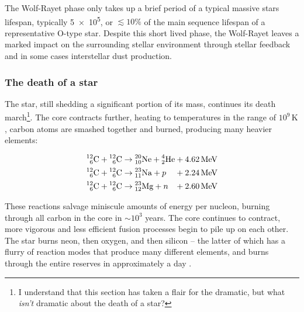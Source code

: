 The Wolf-Rayet phase only takes up a brief period of a typical massive stars lifespan, typically \SI{5e5}{\year}, or $\lesssim 10\%$ of the main sequence lifespan of a representative O-type star.
Despite this short lived phase, the Wolf-Rayet leaves a marked impact on the surrounding stellar environment through stellar feedback and in some cases interstellar dust production.

\subsubsection{The death of a star}

The star, still shedding a significant portion of its mass, continues its death march\footnote{I understand that this section has taken a flair for the dramatic, but what \emph{isn't} dramatic about the death of a star?}.
The core contracts further, heating to temperatures in the range of $10^9 \, \si{\kelvin}$, carbon atoms are smashed together and burned, producing many heavier elements:

\begin{equation}
  \begin{alignedat}{3}
    \atom{C}{12}{6} + \atom{C}{12}{6} & \rightarrow \atom{Ne}{20}{10} + \atom{He}{4}{2} && + \SI{4.62}{\mega\electronvolt} \\
    \atom{C}{12}{6} + \atom{C}{12}{6} & \rightarrow \atom{Na}{23}{11} + p && + \SI{2.24}{\mega\electronvolt} \\
    \atom{C}{12}{6} + \atom{C}{12}{6} & \rightarrow \atom{Mg}{23}{12} + n && + \SI{2.60}{\mega\electronvolt}
  \end{alignedat}
\end{equation}

\noindent
These reactions salvage miniscule amounts of energy per nucleon, burning through all carbon in the core in $\sim 10^3$ years.
The core continues to contract, more vigorous and less efficient fusion processes begin to pile up on each other.
The star burns neon, then oxygen, and then silicon -- the latter of which has a flurry of reaction modes that produce many different elements, and burns through the entire reserves in approximately a day
\parencite[Ch.~6]{ryanStellarEvolutionNucleosynthesis2010a}.

